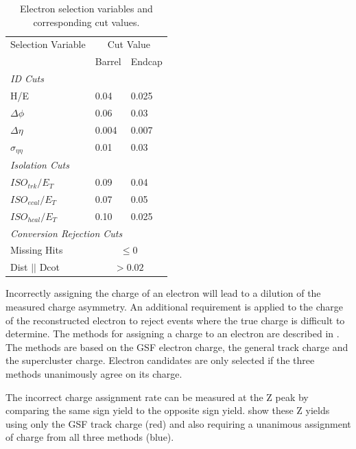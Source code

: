 \begin{table}[htbp]
  \begin{center}
    \leavevmode
    \begin{tabular}{lll} 
    \toprule
      Selection Variable & \multicolumn{2}{c}{Cut Value}\\
                         & Barrel & Endcap\\
      \midrule
      \multicolumn{3}{l}{\emph{ID Cuts}}\\ 
        H/E & 0.04 & 0.025 \\
        $\Delta\phi$ & 0.06 & 0.03 \\
        $\Delta\eta$ & 0.004 & 0.007  \\
        $\sigma_{\eta\eta}$ & 0.01 & 0.03 \\ \midrule
      \multicolumn{3}{l}{\emph{Isolation Cuts}}\\
        $ISO_{trk} / E_T $  & 0.09 & 0.04 \\
        $ISO_{ecal}/ E_T$  & 0.07 & 0.05 \\
        $ISO_{hcal}/ E_T$  & 0.10 & 0.025 \\ \midrule
      \multicolumn{3}{l}{\emph{Conversion Rejection Cuts}}\\ 
        Missing Hits  & \multicolumn{2}{c}{$\leq 0$}\\
        Dist $||$ Dcot   & \multicolumn{2}{c}{$>0.02$}\\
    \bottomrule
    \end{tabular}
    \caption{\label{tab:electronselection} Electron selection variables and corresponding cut values.}
  \end{center}
\end{table}

Incorrectly assigning the charge of an electron will lead to a dilution of the
measured charge asymmetry.  An additional requirement is applied to the charge
of the reconstructed electron to reject events where the true charge is
difficult to determine.  The methods for assigning a charge to an electron are
described in . The methods are based on the GSF electron
charge, the general track charge and the supercluster charge.
Electron candidates are only selected if the three methods unanimously agree on
its charge.

The incorrect charge assignment rate can be measured at the Z peak by comparing the same
sign \HepProcess{\PZ\to\Pepm\Pepm} yield to the opposite sign
\HepProcess{\PZ\to\Pepm\Pemp} yield.  show these Z yields
using only the \ac{GSF} track charge (red) and also requiring a unanimous
assignment of charge from all three methods (blue). 

